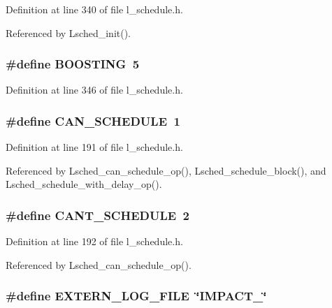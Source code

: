 Definition at line 340 of file l\_\-schedule.h.

Referenced by Lsched\_\-init().
\subsubsection{\setlength{\rightskip}{0pt plus 5cm}\#define BOOSTING~5}\label{l__schedule_8h_0ef648568d9ad0edf6c82e66fe0e8074}




Definition at line 346 of file l\_\-schedule.h.
\subsubsection{\setlength{\rightskip}{0pt plus 5cm}\#define CAN\_\-SCHEDULE~1}\label{l__schedule_8h_c0ae0877300188829ef842b4479e1c69}




Definition at line 191 of file l\_\-schedule.h.

Referenced by Lsched\_\-can\_\-schedule\_\-op(), Lsched\_\-schedule\_\-block(), and Lsched\_\-schedule\_\-with\_\-delay\_\-op().
\subsubsection{\setlength{\rightskip}{0pt plus 5cm}\#define CANT\_\-SCHEDULE~2}\label{l__schedule_8h_763ecfc7a859945e3f34e10564cf7030}




Definition at line 192 of file l\_\-schedule.h.

Referenced by Lsched\_\-can\_\-schedule\_\-op().
\subsubsection{\setlength{\rightskip}{0pt plus 5cm}\#define EXTERN\_\-LOG\_\-FILE~\char`\"{}IMPACT\_\char`\"{}}\label{l__schedule_8h_8b554a9a0abb5566cebe77675fd21794}




